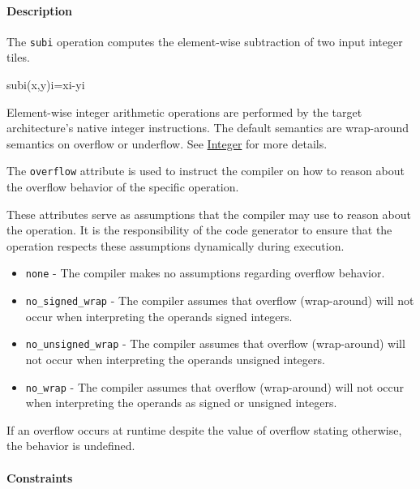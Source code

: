 \documentclass{article}
\begin{document}
\begin{itemize}
\paragraph{Description}

\end{itemize}
The \texttt{subi} operation computes the element-wise subtraction of two input integer tiles.


subi(x,y)i=xi-yi

Element-wise integer arithmetic operations are performed by the target architecture's native integer instructions. The default semantics are wrap-around semantics on overflow or underflow. See \href{https://docs.nvidia.com/cuda/tile-ir/latest/sections/operations.html#op-group-integer}{Integer} for more details.


The \texttt{overflow} attribute is used to instruct the compiler on how to reason about the overflow behavior of the specific operation.


These attributes serve as assumptions that the compiler may use to reason about the operation. It is the responsibility of the code generator to ensure that the operation respects these assumptions dynamically during execution.


\begin{itemize}
\item \texttt{none} - The compiler makes no assumptions regarding overflow behavior.
\item \texttt{no\_signed\_wrap} - The compiler assumes that overflow (wrap-around) will not occur when interpreting the operands signed integers.
\item \texttt{no\_unsigned\_wrap} - The compiler assumes that overflow (wrap-around) will not occur when interpreting the operands unsigned integers.
\item \texttt{no\_wrap} - The compiler assumes that overflow (wrap-around) will not occur when interpreting the operands as signed or unsigned integers.

\end{itemize}
If an overflow occurs at runtime despite the value of overflow stating otherwise, the behavior is undefined.



\paragraph{Constraints}
\end{document}

